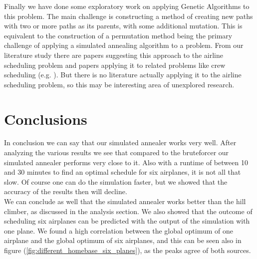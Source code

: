 \documentclass[journal]{IEEEtran}
\begin{document}
Finally we have done some exploratory work on applying Genetic Algorithms to this problem. The main challenge is constructing a method of creating new paths with two or more paths as its parents, with some additional mutation. This is equivalent to the construction of a permutation method being the primary challenge of applying a simulated annealing algorithm to a problem. From our literature study there are papers suggesting this approach to the airline scheduling problem and papers applying it to related problems like crew scheduling  (e.g. \cite{Levine1996}). But there is no literature actually applying it to the airline scheduling problem, so this may be interesting area of unexplored research.




\section{Conclusions}
In conclusion we can say that our simulated annealer works very well. After analyzing the various results we see that compared to the bruteforcer our simulated annealer performs very close to it. Also with a runtime of between 10 and 30 minutes to find an optimal schedule for six airplanes, it is not all that slow. Of course one can do the simulation faster, but we showed that the accuracy of the results then will decline.\\
We can conclude as well that the simulated annealer works better than the hill climber, as discussed in the analysis section. We also showed that the outcome of scheduling six airplanes can be predicted with the output of the simulation with one plane. We found a high correlation between the global optimum of one airplane and the global optimum of six airplanes, and this can be seen also in figure (\ref{fig:different_homebase_six_planes}), as the peaks agree of both sources.


\end{document}
